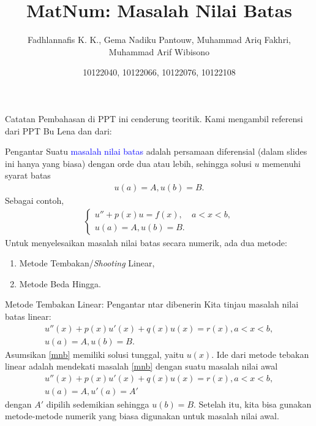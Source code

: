 \documentclass[xcolor={dvipsnames}, 9pt]{beamer}
\title{MatNum: Masalah Nilai Batas}
\author{Fadhlannafis K. K., Gema Nadiku Pantouw, Muhammad Ariq Fakhri, Muhammad Arif Wibisono}
\date{10122040, 10122066, 10122076, 10122108}
\renewcommand{\emph}[1]{\textcolor{Blue}{#1}}
\begin{document}
	\begin{frame}[plain]
		\maketitle
	\end{frame}
	\begin{frame}{Catatan}
		Pembahasan di PPT ini cenderung teoritik. Kami mengambil referensi dari PPT Bu Lena dan dari:
		\nocite{*}
		\printbibliography
	\end{frame}
	\begin{frame}{Pengantar}
		Suatu \emph{masalah nilai batas} adalah persamaan diferensial (dalam slides ini hanya yang biasa) dengan orde dua atau lebih, sehingga solusi $u$ memenuhi syarat batas
		\begin{align*}
			u(a) = A, u(b) = B.
		\end{align*}
		Sebagai contoh,
		\begin{align*}
			\begin{cases}
				u'' + p(x)u = f(x), & a<x<b, \\
				u(a) = A, u(b) = B.
			\end{cases}
		\end{align*}
		Untuk menyelesaikan masalah nilai batas secara numerik, ada dua metode:
		\begin{enumerate}
			\item Metode Tembakan/\textit{Shooting} Linear,
			\item Metode Beda Hingga.
		\end{enumerate}
	\end{frame}
	\begin{frame}{Metode Tembakan Linear: Pengantar}
        ntar dibenerin \newline
	   Kita tinjau masalah nilai batas linear:
        \begin{gather}
            u''(x) + p(x)u'(x) + q(x)u(x) = r(x), a<x<b, \label{mnb} \\
            u(a) = A, u(b) = B. \nonumber
        \end{gather}
       Asumsikan \eqref{mnb} memiliki solusi tunggal, yaitu $u(x)$. Ide dari metode tebakan linear adalah mendekati masalah \eqref{mnb} dengan suatu masalah nilai awal
       \begin{gather}
           u''(x) + p(x)u'(x) + q(x)u(x) = r(x), a<x<b, \label{mna} \\
            u(a) = A, u'(a) = A' \nonumber
       \end{gather}
       dengan $A'$ dipilih sedemikian sehingga $u(b)=B$. Setelah itu, kita bisa gunakan metode-metode numerik yang biasa digunakan untuk masalah nilai awal.
	\end{frame}
\end{document}
